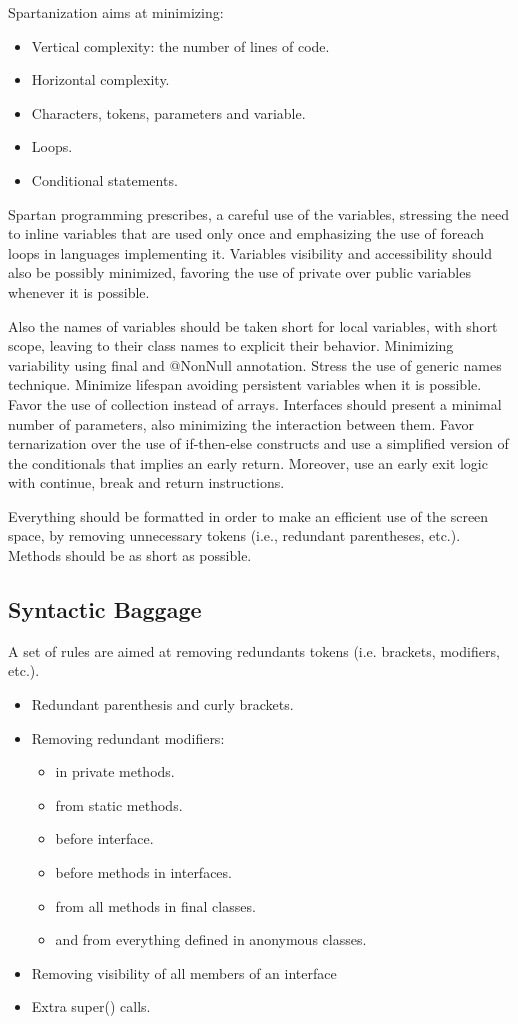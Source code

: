 Spartanization aims at minimizing:
\begin{itemize}
 \item Vertical complexity: the number of lines of code.
 \item Horizontal complexity.
 \item Characters, tokens, parameters and variable.
 \item Loops.
 \item Conditional statements.
\end{itemize}

Spartan programming prescribes, a careful use of the variables, stressing the need
to inline variables that are used only once and emphasizing the use of foreach loops
in languages implementing it. Variables visibility and accessibility should also be
possibly minimized, favoring the use of private over public variables whenever it
is possible.

Also the names of variables should be taken short for local variables, with short scope,
leaving to their class names to explicit their behavior. Minimizing variability using
final and @NonNull annotation. Stress the use of generic names technique. Minimize lifespan
avoiding persistent variables when it is possible. Favor the use of collection instead
of arrays. Interfaces should present a minimal number of parameters, also minimizing
the interaction between them. Favor ternarization over the use of if-then-else constructs
and use a simplified version of the conditionals that implies an early return. Moreover,
use an early exit logic with continue, break and return instructions.

Everything should be formatted in order to make an efficient use of the screen space,
by removing unnecessary tokens (i.e., redundant parentheses, etc.).
Methods should be as short as possible.

\subsection{Syntactic Baggage}
A set of rules are aimed at removing redundants tokens (i.e. brackets, modifiers, etc.).
\begin{itemize}
  \item Redundant parenthesis and curly brackets.
  \item Removing redundant modifiers:
  \begin{itemize}
    \item {} in private methods.
    \item {} from static methods.
    \item {} before interface.
    \item {} before methods in interfaces.
    \item {} from all methods in final classes.
    \item {} and  from everything defined in anonymous classes.
  \end{itemize}
  \item Removing visibility of all members of an interface
  \item Extra super() calls.
\end{itemize}

